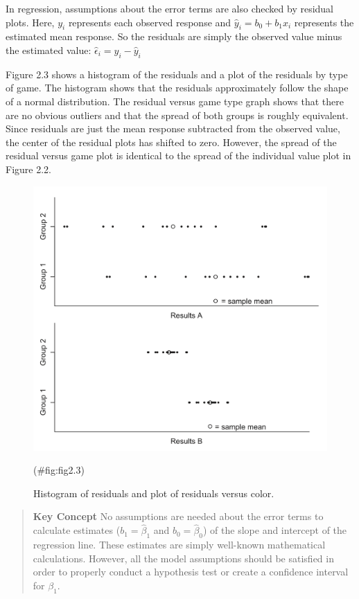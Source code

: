 \documentclass[
]{report}
\begin{document}
In regression, assumptions about the error terms are also checked by residual plots. Here, \(y_i\) represents each observed response and \(\hat{y}_i = b_0 + b_1x_i\) represents the estimated mean response. So the residuals are simply the observed value minus the estimated value: \(\hat{\epsilon}_i = y_i - \hat{y}_i\)

Figure 2.3 shows a histogram of the residuals and a plot of the residuals by type of game. The histogram shows that the residuals approximately follow the shape of a normal distribution. The residual versus game type graph shows that there are no obvious outliers and that the spread of both groups is roughly equivalent. Since residuals are just the mean response subtracted from the observed value, the center of the residual plots has shifted to zero. However, the spread of the residual versus game plot is identical to the spread of the individual value plot in Figure 2.2.

\begin{figure}

{\centering \includegraphics[width=1\linewidth]{docs/Fig2_3} 

}

\caption{Histogram of residuals and plot of residuals versus color.}(\#fig:fig2.3)
\end{figure}

\begin{quote}
\textbf{Key Concept}
No assumptions are needed about the error terms to calculate estimates (\(b_1 = \hat{\beta}_1\) and \(b_0 = \hat{\beta}_0\)) of the slope and intercept of the regression line. These estimates are simply well-known mathematical calculations. However, all the model assumptions should be satisfied in order to properly conduct a hypothesis test or create a confidence interval for \(\beta_1\).
\end{quote}
\end{document}

